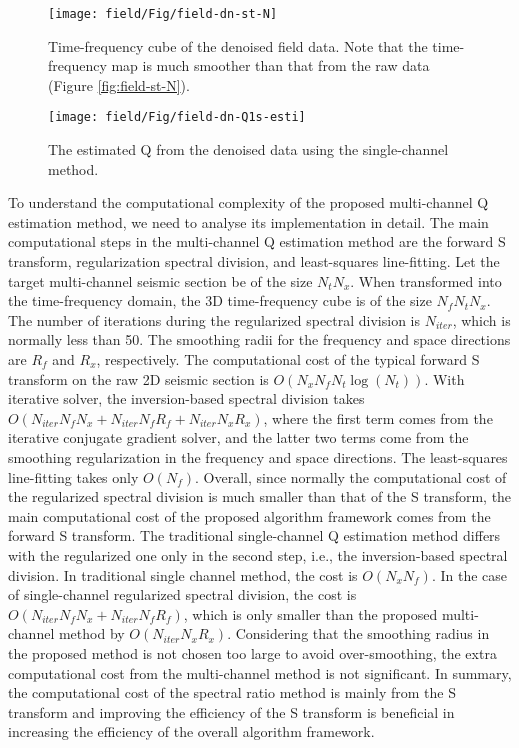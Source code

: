 \begin{figure}[htb!]
	\centering
	\texttt{[image: field/Fig/field-dn-st-N]}
	\caption{Time-frequency cube of the denoised field data. Note that the time-frequency map is much smoother than that from the raw data (Figure \ref{fig:field-st-N}). }
	\label{fig:field-dn-st-N}
\end{figure}

\begin{figure}[htb!]
	\centering
	\texttt{[image: field/Fig/field-dn-Q1s-esti]}
	\caption{The estimated Q from the denoised data using the single-channel method.}
	\label{fig:field-dn-Q1s-esti}
\end{figure}





To understand the computational complexity of the proposed multi-channel Q estimation method, we need to analyse its implementation in detail. The main computational steps in the multi-channel Q estimation method are the forward S transform, regularization spectral division, and least-squares line-fitting. Let the target multi-channel seismic section be of the size $N_tN_x$. When transformed into the time-frequency domain, the 3D time-frequency cube is of the size $N_fN_tN_x$. The number of iterations during the regularized spectral division is $N_{iter}$, which is normally less than 50. The smoothing radii for the frequency and space directions are $R_f$ and $R_x$, respectively. The computational cost of the typical forward S transform on the raw 2D seismic section is $O(N_xN_fN_t\log(N_t))$. With iterative solver, the inversion-based spectral division takes $O(N_{iter}N_fN_x+N_{iter}N_fR_f+N_{iter}N_xR_x)$, where the first term comes from the iterative conjugate gradient solver, and the latter two terms come from the smoothing regularization in the frequency and space directions. The least-squares line-fitting takes only $O(N_f)$. Overall, since normally the computational cost of the regularized spectral division is much smaller than that of the S transform, the main computational cost of the proposed algorithm framework comes from the forward S transform. The traditional single-channel Q estimation method differs with the regularized one only in the second step, i.e., the inversion-based spectral division. In traditional single channel method, the cost is $O(N_xN_f)$. In the case of single-channel regularized spectral division, the cost is $O(N_{iter}N_fN_x+N_{iter}N_fR_f)$, which is only smaller than the proposed multi-channel method by $O(N_{iter}N_xR_x)$. Considering that the smoothing radius in the proposed method is not chosen too large to avoid over-smoothing, the extra computational cost from the multi-channel method is not significant. In summary, the computational cost of the spectral ratio method is mainly from the S transform and improving the efficiency of the S transform is beneficial in increasing the efficiency of the overall algorithm framework.







